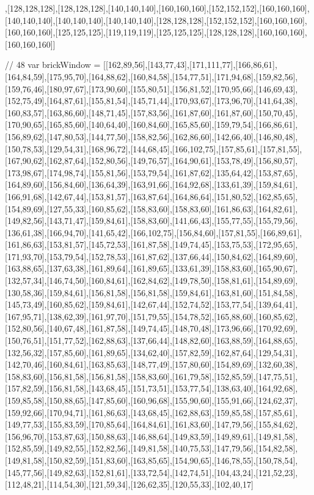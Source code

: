 ,[128,128,128],[128,128,128],[140,140,140],[160,160,160],[152,152,152],[160,160,160],[140,140,140],[140,140,140],[140,140,140],[128,128,128],[152,152,152],[160,160,160],[160,160,160],[125,125,125],[119,119,119],[125,125,125],[128,128,128],[160,160,160],[160,160,160]]

// 48
var brickWindow = [[162,89,56],[143,77,43],[171,111,77],[166,86,61],[164,84,59],[175,95,70],[164,88,62],[160,84,58],[154,77,51],[171,94,68],[159,82,56],[159,76,46],[180,97,67],[173,90,60],[155,80,51],[156,81,52],[170,95,66],[146,69,43],[152,75,49],[164,87,61],[155,81,54],[145,71,44],[170,93,67],[173,96,70],[141,64,38],[160,83,57],[163,86,60],[148,71,45],[157,83,56],[161,87,60],[161,87,60],[150,70,45],[170,90,65],[165,85,60],[140,64,40],[160,84,60],[165,85,60],[159,79,54],[166,86,61],[156,89,62],[147,80,53],[144,77,50],[158,82,56],[162,86,60],[142,66,40],[146,80,48],[150,78,53],[129,54,31],[168,96,72],[144,68,45],[166,102,75],[157,85,61],[157,81,55],[167,90,62],[162,87,64],[152,80,56],[149,76,57],[164,90,61],[153,78,49],[156,80,57],[173,98,67],[174,98,74],[155,81,56],[153,79,54],[161,87,62],[135,64,42],[153,87,65],[164,89,60],[156,84,60],[136,64,39],[163,91,66],[164,92,68],[133,61,39],[159,84,61],[166,91,68],[142,67,44],[153,81,57],[163,87,64],[164,86,64],[151,80,52],[162,85,65],[154,89,69],[127,55,33],[160,85,62],[158,83,60],[158,83,60],[161,86,63],[164,82,61],[149,82,56],[143,71,47],[159,84,61],[158,83,60],[141,66,43],[155,77,55],[155,79,56],[136,61,38],[166,94,70],[141,65,42],[166,102,75],[156,84,60],[157,81,55],[166,89,61],[161,86,63],[153,81,57],[145,72,53],[161,87,58],[149,74,45],[153,75,53],[172,95,65],[171,93,70],[153,79,54],[152,78,53],[161,87,62],[137,66,44],[150,84,62],[164,89,60],[163,88,65],[137,63,38],[161,89,64],[161,89,65],[133,61,39],[158,83,60],[165,90,67],[132,57,34],[146,74,50],[160,84,61],[162,84,62],[149,78,50],[158,81,61],[154,89,69],[130,58,36],[159,84,61],[156,81,58],[156,81,58],[159,84,61],[163,81,60],[151,84,58],[145,73,49],[160,85,62],[159,84,61],[142,67,44],[152,74,52],[153,77,54],[139,64,41],[167,95,71],[138,62,39],[161,97,70],[151,79,55],[154,78,52],[165,88,60],[160,85,62],[152,80,56],[140,67,48],[161,87,58],[149,74,45],[148,70,48],[173,96,66],[170,92,69],[150,76,51],[151,77,52],[162,88,63],[137,66,44],[148,82,60],[163,88,59],[164,88,65],[132,56,32],[157,85,60],[161,89,65],[134,62,40],[157,82,59],[162,87,64],[129,54,31],[142,70,46],[160,84,61],[163,85,63],[148,77,49],[157,80,60],[154,89,69],[132,60,38],[158,83,60],[156,81,58],[156,81,58],[158,83,60],[161,79,58],[152,85,59],[147,75,51],[157,82,59],[156,81,58],[143,68,45],[151,73,51],[153,77,54],[138,63,40],[164,92,68],[159,85,58],[150,88,65],[147,85,60],[160,96,68],[155,90,60],[155,91,66],[124,62,37],[159,92,66],[170,94,71],[161,86,63],[143,68,45],[162,88,63],[159,85,58],[157,85,61],[149,77,53],[155,83,59],[170,85,64],[164,84,61],[161,83,60],[147,79,56],[155,84,62],[156,96,70],[153,87,63],[150,88,63],[146,88,64],[149,83,59],[149,89,61],[149,81,58],[152,85,59],[149,82,55],[152,82,56],[149,81,58],[140,75,53],[147,79,56],[154,82,58],[149,81,58],[150,82,59],[151,83,60],[163,85,65],[154,90,65],[146,78,55],[150,78,54],[145,77,56],[149,82,63],[152,81,61],[133,72,54],[142,74,51],[104,43,24],[121,52,23],[112,48,21],[114,54,30],[121,59,34],[126,62,35],[120,55,33],[102,40,17]
